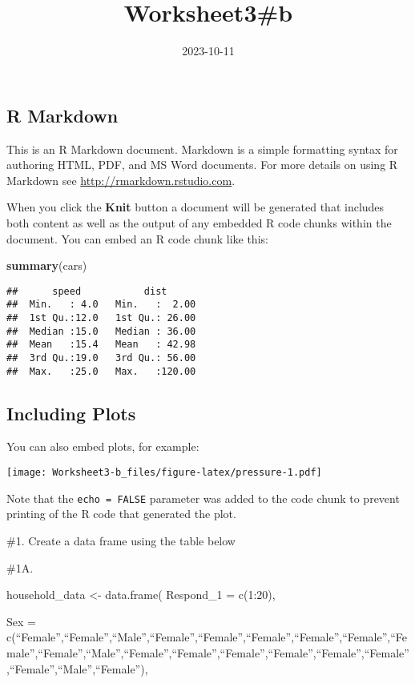 \documentclass[
]{article}
\title{Worksheet3\#b}
\author{}
\date{\vspace{-2.5em}2023-10-11}
\newenvironment{Shaded}{\begin{snugshade}}{\end{snugshade}}
\newcommand{\FunctionTok}[1]{\textcolor[rgb]{0.13,0.29,0.53}{\textbf{#1}}}
\newcommand{\NormalTok}[1]{#1}
\begin{document}
\maketitle

\hypertarget{r-markdown}{%
\subsection{R Markdown}\label{r-markdown}}

This is an R Markdown document. Markdown is a simple formatting syntax
for authoring HTML, PDF, and MS Word documents. For more details on
using R Markdown see \url{http://rmarkdown.rstudio.com}.

When you click the \textbf{Knit} button a document will be generated
that includes both content as well as the output of any embedded R code
chunks within the document. You can embed an R code chunk like this:

\begin{Shaded}
\begin{Highlighting}[]
\FunctionTok{summary}\NormalTok{(cars)}
\end{Highlighting}
\end{Shaded}

\begin{verbatim}
##      speed           dist       
##  Min.   : 4.0   Min.   :  2.00  
##  1st Qu.:12.0   1st Qu.: 26.00  
##  Median :15.0   Median : 36.00  
##  Mean   :15.4   Mean   : 42.98  
##  3rd Qu.:19.0   3rd Qu.: 56.00  
##  Max.   :25.0   Max.   :120.00
\end{verbatim}

\hypertarget{including-plots}{%
\subsection{Including Plots}\label{including-plots}}

You can also embed plots, for example:

\texttt{[image: Worksheet3-b\_files/figure-latex/pressure-1.pdf]}

Note that the \texttt{echo\ =\ FALSE} parameter was added to the code
chunk to prevent printing of the R code that generated the plot.

\#1. Create a data frame using the table below

\#1A.

household\_data \textless- data.frame( Respond\_1 = c(1:20),

Sex =
c(``Female'',``Female'',``Male'',``Female'',``Female'',``Female'',``Female'',``Female'',``Female'',``Female'',``Male'',``Female'',``Female'',``Female'',``Female'',``Female'',``Female'',``Female'',``Male'',``Female''),
\end{document}
